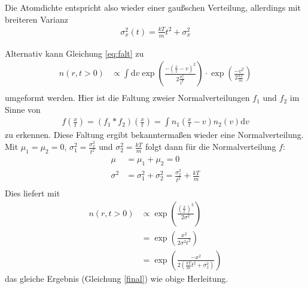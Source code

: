 \documentclass[10pt,a4paper]{extarticle}
\begin{document}
Die Atomdichte entspricht also wieder einer gaußschen Verteilung, allerdings mit breiteren Varianz
\begin{align}
\sigma_x^2 \left(t\right) = \frac{kT}{m}t^2 + \sigma_x^2 \label{final}
\end{align}

Alternativ kann Gleichung \eqref{eq:falt} zu 
\begin{align*}
n(r, t> 0) &\varpropto \int \mathrm{d}v \exp\left(\frac{-(\frac{x}{t}-v)^2}{2 \frac{\sigma_x^2}{t^2}}\right) \cdot \exp \left(\frac{-v^2}{2\frac{kT}{m}}\right) \\
\end{align*}
umgeformt werden.
Hier ist die Faltung zweier Normalverteilungen $f_1$ und $f_2$ im Sinne von
\begin{align*}
f \left(\frac{x}{t}\right) = \left(f_1 * f_2\right) \left(\frac{x}{t}\right) = \int  n_1\left(\frac{x}{t}-v\right) n_2 \left(v\right)\mathrm{d}v
\end{align*}
zu erkennen.
Diese Faltung ergibt bekanntermaßen wieder eine Normalverteilung.
Mit $\mu_1 = \mu_2 = 0$, $\sigma_1^2 = \frac{\sigma_x^2}{t^2}$ und $\sigma_2^2 = \frac{kT}{m}$ folgt dann für die Normalverteilung $f$:
\begin{align*}
\mu &= \mu_1 + \mu_2 = 0 \\
\sigma^2 &= \sigma_1^2 + \sigma_2^2 =  \frac{\sigma_x^2}{t^2} + \frac{kT}{m}\\
\end{align*}
Dies liefert mit 
\begin{align*}
n(r, t> 0) &\varpropto \exp\left(\frac{\left(\frac{x}{t}\right)^2}{2 \sigma^2}\right) \\
&= \exp\left(\frac{x^2}{2 \sigma^2 t^2}\right) \\
&= \exp\left(\frac{- x^2 }{2\left(\frac{kT}{m}t^2 + \sigma_x^2\right)}\right) 
\end{align*}
das gleiche Ergebnis (Gleichung \eqref{final}) wie obige Herleitung.
\end{document}
